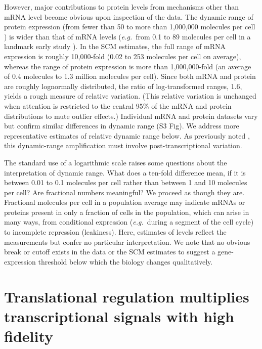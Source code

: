 \documentclass[10pt]{article}
\newcommand{\eg}{\textit{e.g.}}
\begin{document}
However, major contributions to protein levels from mechanisms other than mRNA
level become obvious upon inspection of the data. The dynamic range of
protein expression (from fewer than 50 to more than 1,000,000 molecules per cell
\cite{ghaemmaghami03,picotti09}) is wider than that of mRNA levels (\eg~from 0.1 to 89 molecules per cell in a landmark early study \cite{holstege98}). In the 
SCM estimates, the full range of mRNA expression is roughly 10,000-fold (0.02 to 253 molecules per cell on average), whereas the range of protein expression is more than 1,000,000-fold (an average of 0.4 molecules to 1.3 million molecules per cell). 
Since both mRNA and protein are roughly lognormally distributed, the ratio of log-transformed ranges, 1.6, yields a rough measure of relative variation. (This relative variation is unchanged when attention is restricted to the central 95\% of the mRNA and protein distributions to mute outlier effects.) Individual mRNA and protein datasets vary but confirm similar differences in dynamic range (S3 Fig).
We address more representative estimates of relative dynamic range below. As previously noted \cite{vogel12}, this dynamic-range amplification must involve post-transcriptional variation.

The standard use of a logarithmic scale raises some questions about the interpretation of dynamic range. What does a ten-fold difference mean, if it is between 0.01 to 0.1 molecules per cell rather than between 1 and 10 molecules per cell? Are fractional numbers meaningful? We proceed as though they are. Fractional molecules per cell in a population average may indicate mRNAs or proteins present in only a fraction of cells in the population, which can arise in many ways, from conditional expression (\eg~during a segment of the cell cycle) to incomplete repression (leakiness). Here, estimates of levels reflect the measurements but confer no particular interpretation. We note that no obvious break or cutoff exists in the data or the SCM estimates to suggest a gene-expression threshold below which the biology changes qualitatively.

\section*{Translational regulation multiplies transcriptional signals with high fidelity}
\end{document}
